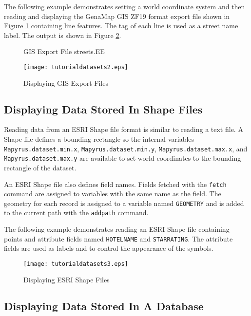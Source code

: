 The following example demonstrates setting a world coordinate system and then
reading and displaying the GenaMap GIS ZF19 format export file shown in Figure
\ref{streetsEE} containing line
features.  The tag of each line is used as a street name label.
The output is shown in Figure \ref{tutorialdatasets2}.

\begin{figure}[htb]

\caption{GIS Export File streets.EE}
\label{streetsEE}
\end{figure}



\begin{figure}[htb]
\texttt{[image: tutorialdatasets2.eps]}
\caption{Displaying GIS Export Files}
\label{tutorialdatasets2}
\end{figure}

\subsection{Displaying Data Stored In Shape Files}

Reading data from an ESRI Shape file format is similar to reading a text file.
A Shape file defines a bounding rectangle so the internal variables
\texttt{Mapyrus.dataset.min.x}, \texttt{Mapyrus.dataset.min.y},
\texttt{Mapyrus.dataset.max.x}, and \texttt{Mapyrus.dataset.max.y} are
available to set world coordinates to the bounding rectangle of the dataset.

An ESRI Shape file also defines field names.  Fields fetched with the
\texttt{fetch} command are assigned to variables with the same name as the
field.  The geometry for each record is assigned to a variable named
\texttt{GEOMETRY} and is added to the current path with the \texttt{addpath}
command.

The following example demonstrates reading an ESRI Shape file containing points
and attribute fields named \texttt{HOTELNAME} and \texttt{STARRATING}.  The
attribute fields are used as labels and to control the appearance of the
symbols.



\begin{figure}[htb]
\texttt{[image: tutorialdatasets3.eps]}
\caption{Displaying ESRI Shape Files}
\label{tutorialdatasets3}
\end{figure}

\subsection{Displaying Data Stored In A Database}

